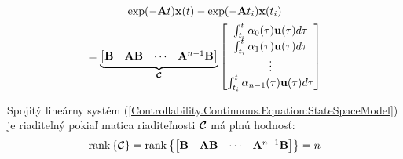 \documentclass[a4paper, 10pt, ]{article}
\begin{document}
\begin{multline}
    \exp(-\mathbf{A} t) \mathbf{x}(t) - \exp(-\mathbf{A} t_i) \mathbf{x}(t_i) \\ = 
    \underbrace{
        \begin{bmatrix}
            \mathbf{B} & \mathbf{A}\mathbf{B} & \cdots & \mathbf{A}^{n - 1} \mathbf{B}
        \end{bmatrix}
    }_{\boldsymbol{\mathcal{C}}}
    \begin{bmatrix}
        \int_{t_i}^{t} \alpha_0(\tau) \mathbf{u}(\tau) d\tau       \\
        \int_{t_i}^{t} \alpha_1(\tau) \mathbf{u}(\tau) d\tau       \\
        \vdots                                                 \\
        \int_{t_i}^{t} \alpha_{n - 1}(\tau) \mathbf{u}(\tau) d\tau \\
    \end{bmatrix}
\end{multline}

\begin{theorem}
    Spojitý lineárny systém (\ref{Controllability.Continuous.Equation:StateSpaceModel}) je riaditeľný pokiaľ matica riaditeľnosti $\boldsymbol{\mathcal{C}}$ má plnú hodnosť:
    \begin{equation}
        \label{Controllability.Continuous.Equation:ControllabilityTheorem}
        \mathrm{rank} \left\{ \boldsymbol{\mathcal{C}} \right\} = 
        \mathrm{rank} \left\{
            \begin{bmatrix}
                \mathbf{B} & \mathbf{A} \mathbf{B} & \cdots & \mathbf{A}^{n - 1} \mathbf{B}
            \end{bmatrix}
        \right\} = 
        n
    \end{equation}
\end{theorem}
\end{document}
